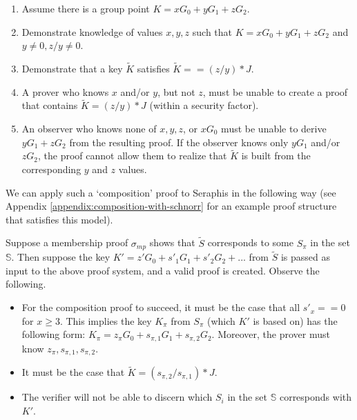 \begin{enumerate}
    \item Assume there is a group point $K = x G_0 + y G_1 + z G_2$.

    \item Demonstrate knowledge of values $x, y, z$ such that $K = x G_0 + y G_1 + z G_2$ and $y \neq 0, z/y \neq 0$.

    \item Demonstrate that a key $\tilde{K}$ satisfies $\tilde{K} == (z/y)*J$.

    \item A prover who knows $x$ and/or $y$, but not $z$, must be unable to create a proof that contains $\tilde{K} = (z/y)*J$ (within a security factor).

    \item An observer who knows none of $x, y, z$, or $x G_0$ must be unable to derive $y G_1 + z G_2$ from the resulting proof. If the observer knows only $y G_1$ and/or $z G_2$, the proof cannot allow them to realize that $\tilde{K}$ is built from the corresponding $y$ and $z$ values.
\end{enumerate}

We can apply such a `composition' proof to Seraphis in the following way (see Appendix \ref{appendix:composition-with-schnorr} for an example proof structure that satisfies this model).

Suppose a membership proof $\sigma_{mp}$ shows that $\tilde{S}$ corresponds to some $S_{\pi}$ in the set $\mathbb{S}$. Then suppose the key $K' = z' G_0 + s'_1 G_1 + s'_2 G_2 + ...$ from $\tilde{S}$ is passed as input to the above proof system, and a valid proof is created. Observe the following.

\begin{itemize}
    \item For the composition proof to succeed, it must be the case that all $s'_x == 0$ for $x \geq 3$. This implies the key $K_{\pi}$ from $S_{\pi}$ (which $K'$ is based on) has the following form: $K_{\pi} = z_{\pi} G_0 + s_{\pi, 1} G_1 + s_{\pi, 2} G_2$. Moreover, the prover must know $z_{\pi}, s_{\pi, 1}, s_{\pi, 2}$.

    \item It must be the case that $\tilde{K} = (s_{\pi, 2}/ s_{\pi, 1})*J$.

    \item The verifier will not be able to discern which $S_i$ in the set $\mathbb{S}$ corresponds with $K'$.
\end{itemize}

